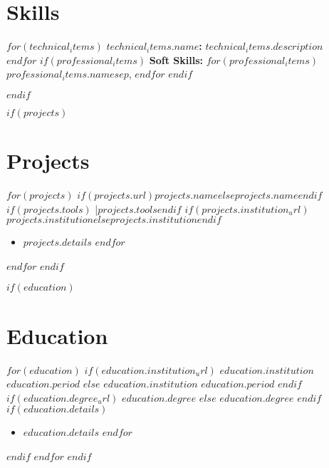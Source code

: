 \documentclass[10.5pt,a4paper]{article}
\newcommand{\daterange}[1]{\textbf{#1}}
\newcommand{\entryHeader}[2]{\noindent\textbf{#1} \hfill \daterange{#2}}
\newcommand{\entryHeaderLinked}[3]{\noindent\textbf{\href{#1}{#2}} \hfill \daterange{#3}}
\newcommand{\entrySubHeader}[1]{\textit{#1}}
\newcommand{\entrySubHeaderLinked}[2]{\textit{\href{#1}{#2}}}
\newenvironment{entryDetails}
  {%
    \begin{itemize}[leftmargin=2.5em, rightmargin=2.5em, itemsep=0.5pt, topsep=1pt, parsep=0pt]
  }
  {%
    \end{itemize}
    \vspace{-0.1cm}
  }
\begin{document}
\section*{Skills}
\begin{multicols}{2}
	\raggedcolumns
	$for(technical_items)$
	\noindent\textbf{$technical_items.name$:} $technical_items.description$\\[1.5pt]
	$endfor$
	$if(professional_items)$
	\noindent\textbf{Soft Skills:} $for(professional_items)$$professional_items.name$$sep$, $endfor$
	$endif$
\end{multicols}
\vspace{-1.5ex}
$endif$

$if(projects)$
\section*{Projects}
$for(projects)$
\noindent\textbf{$if(projects.url)$\href{$projects.url$}{$projects.name$\hspace{0.3em}\raisebox{-0.1em}{\small\faExternalLink}}$else$$projects.name$$endif$}$if(projects.tools)$ \quad|\quad \textit{\small $projects.tools$}$endif$ \hfill \textbf{$if(projects.institution_url)$\href{$projects.institution_url$}{$projects.institution$}$else$\textit{$projects.institution$}$endif$}
\begin{entryDetails}
	$for(projects.details)$
	\item $projects.details$
	$endfor$
\end{entryDetails}
$endfor$
$endif$

$if(education)$
\section*{Education}
$for(education)$
$if(education.institution_url)$
\entryHeaderLinked{$education.institution_url$}{$education.institution$}{$education.period$}
$else$
\entryHeader{$education.institution$}{$education.period$}
$endif$
\\
$if(education.degree_url)$
\entrySubHeaderLinked{$education.degree_url$}{$education.degree$}
$else$
\entrySubHeader{$education.degree$}
$endif$
$if(education.details)$
\begin{itemize}[leftmargin=1.5em, rightmargin=1em, itemsep=0.5pt, topsep=1pt, parsep=0pt]
	$for(education.details)$
	\item $education.details$
	      $endfor$
\end{itemize}
\vspace{-0.1cm}
$endif$
$endfor$
$endif$
\end{document}
